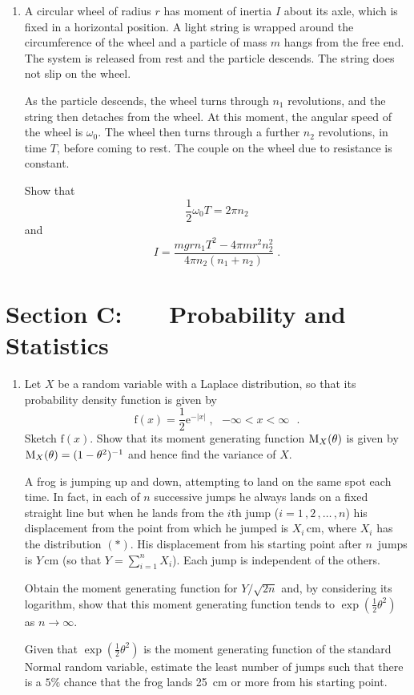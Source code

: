 \documentclass[a4, 11pt]{report}
\newlength{\qspace}
\newcounter{qnumber}
\newenvironment{question}%
 {\vspace{\qspace}
  \begin{enumerate}[\bfseries 1\quad][10]%
    \setcounter{enumi}{\value{qnumber}}%
    \item%
 }
{
  \end{enumerate}
  \filbreak
  \stepcounter{qnumber}
 }
\def\e{{\mathrm e}}
\def\f{{\mathrm f}}
\begin{document}

\begin{question}
A circular wheel of radius $r$ has moment of inertia $I$ about
its
axle, which is fixed in a horizontal position. A light string is
wrapped around the circumference of the wheel and a particle of 
mass $m$ hangs from the free end. The system is released from rest
and the particle descends.
The string does not slip on the wheel.

As the particle descends, the wheel turns through
$n_1$ revolutions, and the string then detaches from the wheel. At this
moment, the angular speed of the wheel is $\omega_0$.  The wheel then
turns through a further
 $n_2$ revolutions, in time $T$, before coming to rest.
The couple on the wheel due to resistance is constant.

Show that
\[ \frac12 \omega_0 T = 2 \pi n_2\]
and
\[
I =\dfrac {mgrn_1T^2 -4\pi mr^2n_2^2}{4\pi n_2(n_1+n_2)}\;.
\]
\end{question}
	

	
	\newpage
\section*{Section C: \ \ \ Probability and Statistics}


\begin{question}
Let $X$ be a random variable with a  Laplace distribution, so that  
its probability 
density function is given by
\[
\f(x) = \frac12 \e^{-\vert x \vert }\;, 
\text{ \ \ \ $-\infty < x < \infty $\ }.
\tag{$*$}
\]
Sketch $\f(x)$. Show that its moment generating function 
${\rm M}_X(\theta)$
  is given by 
${\rm M}_X(\theta)
= (1-\theta^2)^{-1}$ and hence find the variance of $X$.

A frog
is jumping up and down, attempting to land on the same 
spot each time. In fact, in each of $n$ successive jumps
he always lands on a fixed
straight line but when he lands
 from  the $i$th jump ($i=1\,,2\,,\ldots\,,n$) 
his displacement from the point from which he jumped is $X_i\,$cm, 
where $X_i$ has the distribution $(*)$. His displacement from his starting
point after
$n$~jumps is $Y\,$cm (so that 
$Y=\sum\limits_{i=1}^n X_i$).
Each jump
is independent of the others.

Obtain the moment generating function  for $Y/ \sqrt {2n}$
 and, by considering
its logarithm, show that this moment generating function tends to 
$\exp(\frac12\theta^2)$ as $n\to\infty$.

Given that 
$\exp(\frac12\theta^2)$ is the moment generating function
 of the standard Normal
random variable, estimate the least number of jumps such that there
is a $5\%$ chance that the frog lands 25~cm or more from his starting
point.
\end{question}
\end{document}
